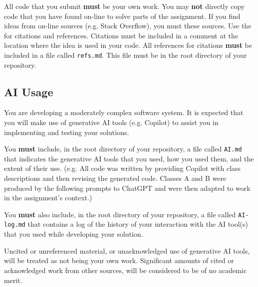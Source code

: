 \documentclass{csse4400}
\begin{document}
All code that you submit \textbf{must} be your own work.
You may \textbf{not} directly copy code that you have found on-line to solve parts of the assignment.
If you find ideas from on-line sources (e.g. Stack Overflow),
you must  these sources.
Use the 
for citations and references.
Citations must be included in a comment at the location where the idea is used in your code.
All references for citations \textbf{must} be included in a file called \texttt{refs.md}.
This file must be in the root directory of your repository.

\subsection{AI Usage}
You are developing a moderately complex software system.
It is expected that you will make use of generative AI tools (e.g. Copilot) to assist you in implementing and testing your solutions.

You \textbf{must} include, in the root directory of your repository,
a file called \texttt{AI.md} that indicates the generative AI tools that you used,
how you used them, and the extent of their use.
(e.g. All code was written by providing Copilot with class descriptions and then revising the generated code.
Classes A and B were produced by the following prompts to ChatGPT
and were then adapted to work in the assignment's context.)

You \textbf{must} also include, in the root directory of your repository,
a file called \texttt{AI-log.md} that contains a log of the history of your interaction with the AI tool(s)
that you used while developing your solution.

Uncited or unreferenced material, or unacknowledged use of generative AI tools,
will be treated as not being your own work.
Significant amounts of cited or acknowledged work from other sources,
will be considered to be of no academic merit.







\end{document}
